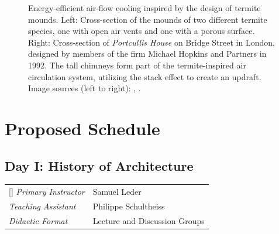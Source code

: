 \documentclass{article}
\begin{document}
\begin{figure}[ht!]
    \centering
    \caption{Energy-efficient air-flow cooling inspired by the design of termite mounds. Left: Cross-section of the mounds of two different termite species, one with open air vents and one with a porous surface. Right: Cross-section of \textit{Portcullis House} on Bridge Street in London, designed by members of the firm Michael Hopkins and Partners in 1992. The tall chimneys form part of the termite-inspired air circulation system, utilizing the stack effect to create an updraft. \newline Image sources (left to right): \cite{turner_beyond_2008}, \cite{davies_hopkins2_2001}.}
    \label{fig:ventilation}
\end{figure}


\clearpage
\section{Proposed Schedule}
\label{sec:schedule}

\subsection{Day I: History of Architecture}

\begin{NiceTabular}{W{l}{3cm}l}[]
\textit{Primary Instructor} & Samuel Leder \\
\textit{Teaching Assistant} & Philippe Schultheiss \\
\textit{Didactic Format} & Lecture and Discussion Groups
\end{NiceTabular}
\end{document}
